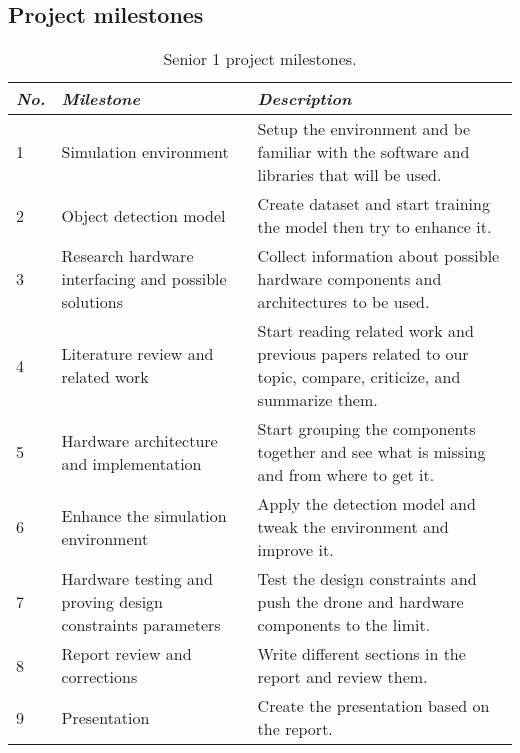 \documentclass[../main.tex]{subfiles}
\begin{document}
\subsection{Project milestones}

\begin{table}[H]
    \centering
    \caption{Senior 1 project milestones.}
    \label{tab:milestones}
    \begin{tabularx}{\textwidth}{ X p{5cm} p{9cm} }
        \toprule

        \textit{No.} & \textit{Milestone} 
            & \textit{Description}
        \\

        \midrule

        1 & Simulation environment
            & Setup the environment and be familiar with the software and libraries that will be used.
        \\
        2 & Object detection model
            & Create dataset and start training the model then try to enhance it.
        \\
        3 & Research hardware interfacing and possible solutions
            & Collect information about possible hardware components and architectures to be used.
        \\
        4 & Literature review and related work
            & Start reading related work and previous papers related to our topic, compare, criticize, and summarize them.
        \\
        5 & Hardware architecture and implementation
            & Start grouping the components together and see what is missing and from where to get it.
        \\
        6 & Enhance the simulation environment
            & Apply the detection model and tweak the environment and improve it.
        \\
        7 & Hardware testing and proving design constraints parameters
            & Test the design constraints and push the drone and hardware components to the limit.
        \\
        8 & Report review and corrections
            & Write different sections in the report and review them.
        \\
        9 & Presentation
            & Create the presentation based on the report.
        \\

        \bottomrule
    \end{tabularx}
\end{table}
\end{document}
